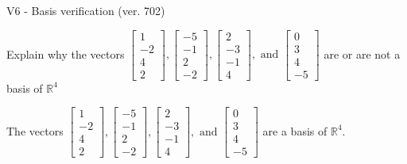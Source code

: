 \begin{exercise}
  \begin{exerciseTitle}V6 - Basis verification (ver. 702)\end{exerciseTitle}
  \begin{exerciseStatement}
    Explain why the vectors \(\left[\begin{array}{r}
1 \\
-2 \\
4 \\
2
\end{array}\right] , \left[\begin{array}{r}
-5 \\
-1 \\
2 \\
-2
\end{array}\right] , \left[\begin{array}{r}
2 \\
-3 \\
-1 \\
4
\end{array}\right] , \text{ and } \left[\begin{array}{r}
0 \\
3 \\
4 \\
-5
\end{array}\right]\) are or are not a basis of \(\mathbb{R}^4\)	


  \end{exerciseStatement}
  \begin{exerciseAnswer}
   The vectors \(\left[\begin{array}{r}
1 \\
-2 \\
4 \\
2
\end{array}\right] , \left[\begin{array}{r}
-5 \\
-1 \\
2 \\
-2
\end{array}\right] , \left[\begin{array}{r}
2 \\
-3 \\
-1 \\
4
\end{array}\right] , \text{ and } \left[\begin{array}{r}
0 \\
3 \\
4 \\
-5
\end{array}\right]\) 
  	 are  a basis of \(\mathbb{R}^4\).
  


  \end{exerciseAnswer}
\end{exercise}